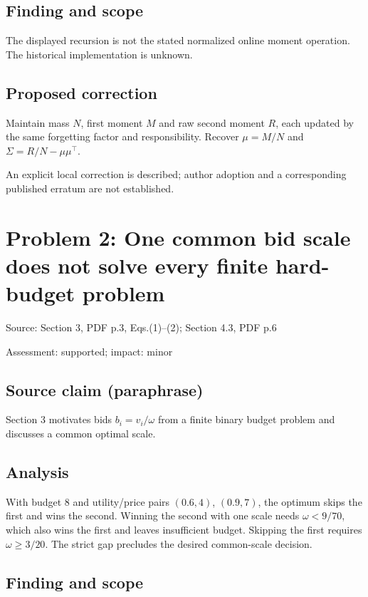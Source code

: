 \documentclass[11pt]{article}
\begin{document}
\subsection*{Finding and scope}

The displayed recursion is not the stated normalized online moment operation. The historical implementation is unknown.

\subsection*{Proposed correction}

Maintain mass \(N\), first moment \(M\) and raw second moment \(R\), each updated by the same forgetting factor and responsibility. Recover \(\mu=M/N\) and \(\Sigma=R/N-\mu\mu^\top\).

An explicit local correction is described; author adoption and a corresponding published erratum are not established.

\section*{Problem 2: One common bid scale does not solve every finite hard-budget problem}

Source: Section 3, PDF p.3, Eqs.(1)–(2); Section 4.3, PDF p.6

Assessment: supported; impact: minor

\subsection*{Source claim (paraphrase)}

Section 3 motivates bids \(b_i=v_i/\omega\) from a finite binary budget problem and discusses a common optimal scale.

\subsection*{Analysis}

With budget \(8\) and utility/price pairs \((0.6,4)\), \((0.9,7)\), the optimum skips the first and wins the second. Winning the second with one scale needs \(\omega<9/70\), which also wins the first and leaves insufficient budget. Skipping the first requires \(\omega\geq3/20\). The strict gap precludes the desired common-scale decision.

\subsection*{Finding and scope}
\end{document}
